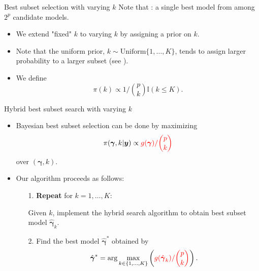 \documentclass[citecolor=blue,10pt]{beamer}
\def\bg{{\boldsymbol \gamma}}
\newcommand{\0} {\mbox{\boldmath$0$}}
\newcommand{\uy}{{\boldsymbol y}}
\begin{document}
\begin{frame}{Best subset selection with varying $k$}
Note that {\color{red}{Goal (ii)}}: a single best model from among $2^p$ candidate models.
\begin{itemize}\itemsep=8mm
\item We extend "fixed" $k$ to varying $k$ by assigning a prior on $k$.
\item Note that the uniform prior, $k \sim \text{Uniform}\{1,\ldots,K\}$, tends to assign larger probability to a larger subset (see \citet{chen2008extended}). 
\item We define
$$\pi(k)\propto 1/\binom{p}{k} \mathbb{I}(k\leq K).$$
\end{itemize}
\end{frame}


\begin{frame}{Hybrid best subset search with varying $k$}
\begin{itemize}\itemsep=3mm
\item Bayesian best subset selection can be done by maximizing
\begin{eqnarray} 
\pi(\bg,k|\uy) \propto {\color{red}{g(\bg)/\binom{p}{k}}}
\end{eqnarray}
over $(\bg,k)$.
\item Our algorithm proceeds as follows:\\

 \begin{itemize}\itemsep=3mm
  \item[1.] \textbf{Repeat} for $k=1,\ldots,K$:
        
 Given $k$, implement the hybrid search algorithm to obtain best subset model $\hat\bg_k$.
        
  \item[2.] Find the best model $\hat\bg^*$ obtained by 
\begin{eqnarray} 
\hat\bg^*=\arg\max_{k\in\{1,\ldots,K \}}\left({\color{red}{g(\hat\bg_k)/\binom{p}{k}}}\right).
\end{eqnarray}
\end{itemize}

\end{itemize}
\end{frame}
\end{document}
